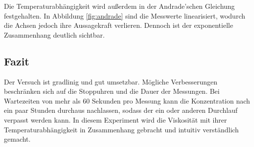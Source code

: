 Die Temperaturabhängigkeit wird außerdem in der Andrade'schen Gleichung festgehalten. In Abbildung \ref{fig:andrade} sind die Messwerte linearisiert, wodurch die Achsen jedoch ihre Aussagekraft verlieren.
Dennoch ist der exponentielle Zusammenhang deutlich sichtbar.

\subsection{Fazit}
Der Versuch ist gradlinig und gut umsetzbar. Mögliche Verbesserungen beschränken sich auf die Stoppuhren und die Dauer der Messungen. Bei Wartezeiten von mehr als 60 Sekunden pro Messung
kann die Konzentration nach ein paar Stunden durchaus nachlassen, sodass der ein oder anderen Durchlauf verpasst werden kann.
In diesem Experiment wird die Viskosität mit ihrer Temperaturabhängigkeit in Zusammenhang gebracht und intuitiv verständlich gemacht.